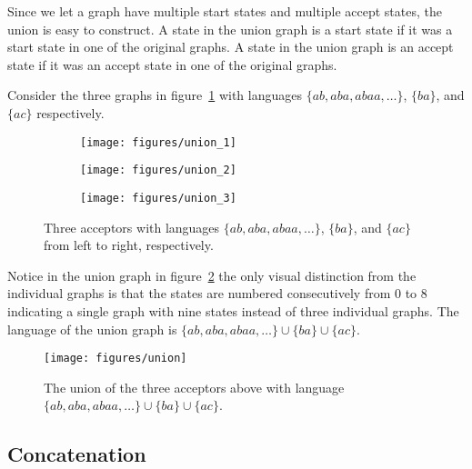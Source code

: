 \documentclass[main.tex]{subfiles}
\begin{document}
Since we let a graph have multiple start states and multiple accept states, the
union is  easy to construct. A state in the union graph is a start state if it
was a start state in one of the original graphs. A state in the union graph is
an accept state if it was an accept state in one of the original graphs.

Consider the three graphs in figure~\ref{fig:union_inputs} with languages
$\{ab, aba, abaa, \ldots\}$, $\{ba\}$, and $\{ac\}$ respectively.

\begin{figure}
    \centering
    \begin{subfigure}[b]{0.8\textwidth}
        \centering
        \texttt{[image: figures/union\_1]}
        \caption{}
    \end{subfigure}
    \par\bigskip
    \begin{subfigure}[b]{0.8\textwidth}
        \centering
        \texttt{[image: figures/union\_2]}
        \caption{}
    \end{subfigure}
    \par\bigskip
    \begin{subfigure}[b]{0.8\textwidth}
        \centering
        \texttt{[image: figures/union\_3]}
        \caption{}
    \end{subfigure}
    \caption{Three acceptors with languages $\{ab, aba, abaa, \ldots\}$,
    $\{ba\}$, and $\{ac\}$ from left to right, respectively.}
    \label{fig:union_inputs}
\end{figure}

Notice in the union graph in figure~\ref{fig:union} the only visual distinction
from the individual graphs is that the states are numbered consecutively from
$0$ to $8$ indicating a single graph with nine states instead of three
individual graphs. The language of the union graph is $\{ab, aba, abaa,
\ldots\} \cup \{ba\} \cup \{ac\}$.

\begin{figure}
    \centering
    \texttt{[image: figures/union]}
    \caption{The union of the three acceptors above with language $\{ab, aba,
    abaa, \ldots\} \cup \{ba\} \cup \{ac\}$.}
    \label{fig:union}
\end{figure}

\subsection{Concatenation}
\end{document}
